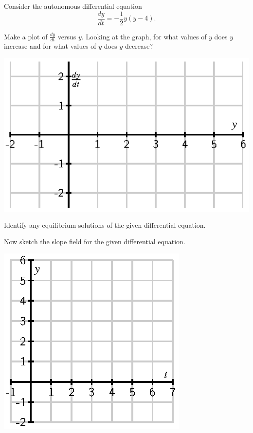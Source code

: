 \begin{activity} \label{A:7.2.2}  
  Consider the autonomous differential equation 
$$
\frac{dy}{dt} = -\frac 12 y(y-4).
$$

\ba
\item Make a plot of $\frac{dy}{dt}$ versus $y$.  Looking at the
  graph, for what values of $y$ does $y$ increase and for what values of $y$
  does $y$ decrease?

  \begin{center}
    \includegraphics{figures/7_2_Act2_1.eps}
  \end{center}

\item Identify any equilibrium solutions of the given differential equation.

\item Now sketch the slope field for the given differential equation.

  \begin{center}
    \includegraphics{figures/7_2_Act2_2.eps}
  \end{center}


\end{activity}
